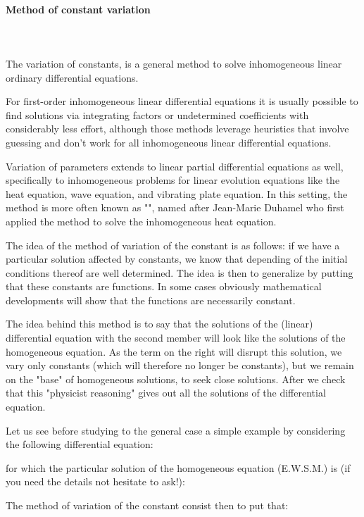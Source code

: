 	\paragraph{Method of constant variation}\mbox{}\\\\
	The variation of constants, is a general method to solve inhomogeneous linear ordinary differential equations.

	For first-order inhomogeneous linear differential equations it is usually possible to find solutions via integrating factors or undetermined coefficients with considerably less effort, although those methods leverage heuristics that involve guessing and don't work for all inhomogeneous linear differential equations.

	Variation of parameters extends to linear partial differential equations as well, specifically to inhomogeneous problems for linear evolution equations like the heat equation, wave equation, and vibrating plate equation. In this setting, the method is more often known as "", named after Jean-Marie Duhamel who first applied the method to solve the inhomogeneous heat equation.
	
	The idea of the method of variation of the constant is as follows: if we have a particular solution affected by constants, we know that depending of the initial conditions thereof are well determined. The idea is then to generalize by putting that these constants are functions. In some cases obviously mathematical developments will show that the functions are necessarily constant.
	
	The idea behind this method is to say that the solutions of the (linear) differential equation with the second member will look like the solutions of the homogeneous equation. As the term on the right will disrupt this solution, we vary only constants (which will therefore no longer be constants), but we remain on the "base" of homogeneous solutions, to seek close solutions. After we check that this "physicist reasoning" gives out all the solutions of the differential equation.
	
	Let us see before studying to the general case a simple example by considering the following differential equation:
	
	for which the particular solution of the homogeneous equation (E.W.S.M.) is (if you need the details not hesitate to ask!):
	
	The method of variation of the constant consist then to put that:
	
